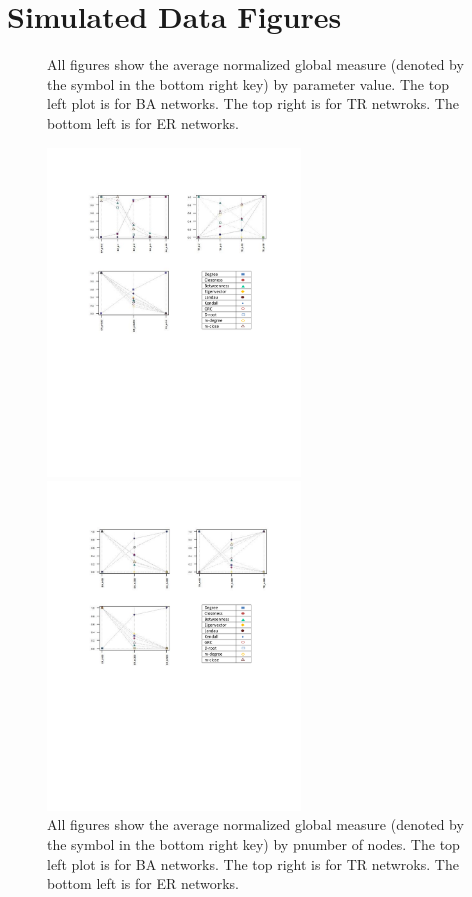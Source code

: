 \documentclass[3p,times]{elsarticle}
\begin{document}
\section{Simulated Data Figures}
\label{sec:simulated figures}
\vspace{-1cm}
\begin{figure}[ht]
	\begin{center}
		\caption{\label{fig::Simulated Parameters} All figures show the average normalized global measure (denoted by the symbol in the bottom right key) by parameter value. The top left plot is for BA networks. The top right is for TR netwroks. The bottom left is for ER networks.}
		\includegraphics[width = 0.60\textwidth]{./images/Norm_Pars.pdf}
	\vspace{-5cm}
	\caption{\label{fig::Simulated Size} All figures show the average normalized global measure (denoted by the symbol in the bottom right key) by pnumber of nodes. The top left plot is for BA networks. The top right is for TR netwroks. The bottom left is for ER networks.}
	\includegraphics[width = 0.60\textwidth]{./images/Norm_Size.pdf}
	\end{center}
\end{figure}
\end{document}
